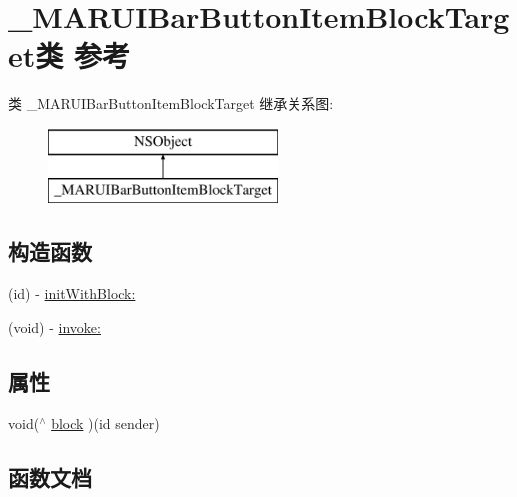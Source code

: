 \hypertarget{interface___m_a_r_u_i_bar_button_item_block_target}{}\section{\+\_\+\+M\+A\+R\+U\+I\+Bar\+Button\+Item\+Block\+Target类 参考}
\label{interface___m_a_r_u_i_bar_button_item_block_target}
类 \+\_\+\+M\+A\+R\+U\+I\+Bar\+Button\+Item\+Block\+Target 继承关系图\+:\begin{figure}[H]
\begin{center}
\leavevmode
\includegraphics[height=2.000000cm]{interface___m_a_r_u_i_bar_button_item_block_target}
\end{center}
\end{figure}
\subsection*{构造函数}
\begin{DoxyCompactItemize}
\item 
(id) -\/ \hyperlink{interface___m_a_r_u_i_bar_button_item_block_target_a7af36a943419694e2c6697c6b72c8280}{init\+With\+Block\+:}
\item 
(void) -\/ \hyperlink{interface___m_a_r_u_i_bar_button_item_block_target_a18ec6b5b36139713b1b290127cb21fb5}{invoke\+:}
\end{DoxyCompactItemize}
\subsection*{属性}
\begin{DoxyCompactItemize}
\item 
void($^\wedge$ \hyperlink{interface___m_a_r_u_i_bar_button_item_block_target_a8032366d0ccecfaf57c2fc76a6eaafdd}{block} )(id sender)
\end{DoxyCompactItemize}


\subsection{函数文档}
\mbox{\label{interface___m_a_r_u_i_bar_button_item_block_target_a7af36a943419694e2c6697c6b72c8280}} 
